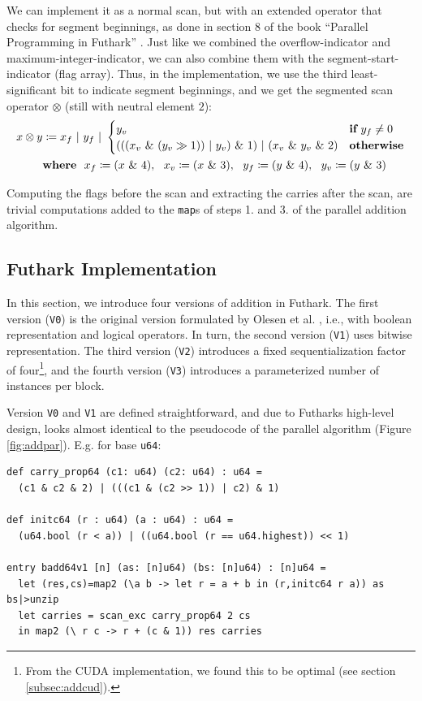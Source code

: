 We can implement it as a normal scan, but with an extended operator that checks
for segment beginnings, as done in section 8 of the book ``Parallel Programming
in Futhark'' \cite{ParallelProgrammingInFuthark}. Just like we combined the
overflow-indicator and maximum-integer-indicator, we can also combine them with
the segment-start-indicator (flag array). Thus, in the implementation, we use
the third least-significant bit to indicate segment beginnings, and we get the
segmented scan operator $\otimes$ (still with neutral element $2$):
\begin{align}
  \label{eq:segscanop}
  x \otimes y &\coloneq x_f~|~y_f~|~\begin{cases} y_v & \textbf{if}~y_f \neq 0 \\ (((x_v~\&~(y_v \gg 1))~|~y_v)~\&~1)~|~(x_v~\&~y_v~\&~2) & \textbf{otherwise}\end{cases}\\
  & \textbf{where}~~x_f\coloneq (x~\&~4),~~x_v\coloneq (x~\&~3),~~y_f\coloneq (y~\&~4),~~y_v\coloneq (y~\&~3)\notag
\end{align}

Computing the flags before the scan and extracting the carries after the scan,
are trivial computations added to the \texttt{map}s of steps 1. and 3. of the
parallel addition algorithm.

\subsection{Futhark Implementation}
\label{subsec:addfut}

In this section, we introduce four versions of addition in Futhark. The first
version (\texttt{V0}) is the original version formulated by Olesen et
al. \cite{DPPproject}, i.e., with boolean representation and logical
operators. In turn, the second version (\texttt{V1}) uses bitwise
representation. The third version (\texttt{V2}) introduces a fixed
sequentialization factor of four\footnote{From the CUDA implementation, we found
  this to be optimal (see section \ref{subsec:addcud}).}, and the fourth version
(\texttt{V3}) introduces a parameterized number of instances per block.

Version \texttt{V0} and \texttt{V1} are defined straightforward, and due to
Futharks high-level design, looks almost identical to the pseudocode of the
parallel algorithm (Figure \ref{fig:addpar}). E.g. for base \texttt{u64}:
\begin{lstlisting}[language=futhark,caption={Futhark addition \texttt{V1} using base \texttt{u64} (from file \texttt{add.fut} slightly edited).}]
def carry_prop64 (c1: u64) (c2: u64) : u64 =
  (c1 & c2 & 2) | (((c1 & (c2 >> 1)) | c2) & 1)

def initc64 (r : u64) (a : u64) : u64 =
  (u64.bool (r < a)) | ((u64.bool (r == u64.highest)) << 1)

entry badd64v1 [n] (as: [n]u64) (bs: [n]u64) : [n]u64 =
  let (res,cs)=map2 (\a b -> let r = a + b in (r,initc64 r a)) as bs|>unzip
  let carries = scan_exc carry_prop64 2 cs
  in map2 (\ r c -> r + (c & 1)) res carries
\end{lstlisting}

